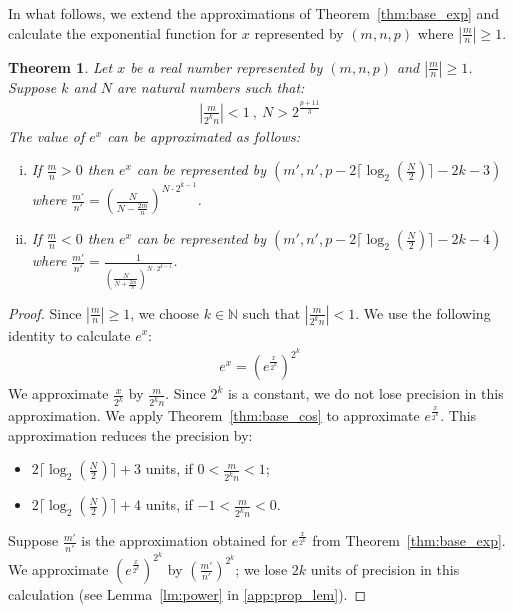 \documentclass{article}
\newcommand{\nat}{\mathbb{N}}
\newtheorem{mytheorem}{Theorem}
\numberwithin{mytheorem}{section}
\begin{document}
In what follows, we extend the approximations of Theorem~\ref{thm:base_exp} and calculate the exponential function for $x$ represented by $(m,n,p)$ where $|\frac{m}{n}|\geq 1$.
\begin{mytheorem}\label{thm:extend_exp}
Let $x$ be a real number represented by $(m,n,p)$ and $|\frac{m}{n}|\geq 1$. Suppose $k$ and $N$ are natural numbers such that:
\begin{align*}
|\frac{m}{2^kn}|<1~,~N>2^{\frac{p+11}{3}}
\end{align*}
The value of $e^x$ can be approximated as follows:
\begin{enumerate}[i.]
\item \label{thm:extend_exp_1}
If $\frac{m}{n}>0$ then $e^x$ can be represented by $(m',n',p-2\lceil\log_2(\frac{N}{2}) \rceil-2k-3)$ where $\frac{m'}{n'}=(\frac{N}{N-\frac{2m}{n}})^{N\cdot 2^{k-1}}$.
\item \label{thm:extend_exp_2}
If $\frac{m}{n}<0$ then $e^x$ can be represented by $(m',n',p-2\lceil\log_2(\frac{N}{2}) \rceil-2k-4)$ where $\frac{m'}{n'}=\frac{1}{(\frac{N}{N+\frac{2m}{n}})^{N\cdot 2^{k-1}}}$.
\end{enumerate}
\end{mytheorem}

\begin{proof}
Since $|\frac{m}{n}|\geq1$, we choose $k\in\nat$ such that $|\frac{m}{2^kn}|<1$. We use the following identity to calculate $e^x$:
\begin{align}
e^x=(e^{\frac{x}{2^k}})^{2^k} \label{eqn:exp_range}
\end{align} 
We approximate $\frac{x}{2^k}$ by $\frac{m}{2^kn}$. Since $2^k$ is a constant, we do not lose precision in this approximation. We apply Theorem~\ref{thm:base_cos} to approximate $e^\frac{x}{2^k}$. This approximation reduces the precision by:
\begin{itemize}
\item
$2\lceil\log_2(\frac{N}{2}) \rceil +3$ units, if $0<\frac{m}{2^kn}<1$;
\item
$2\lceil\log_2(\frac{N}{2}) \rceil +4$ units, if $-1<\frac{m}{2^kn}<0$.
\end{itemize}
Suppose $\frac{m'}{n'}$ is the approximation obtained for $e^{\frac{x}{2^k}}$ from Theorem~\ref{thm:base_exp}. We approximate $(e^{\frac{x}{2^k}})^{2^k}$ by $(\frac{m'}{n'})^{2^k}$; we lose $2k$ units of precision in this calculation (see Lemma~\ref{lm:power} in \ref{app:prop_lem}).

\end{proof}
\end{document}
